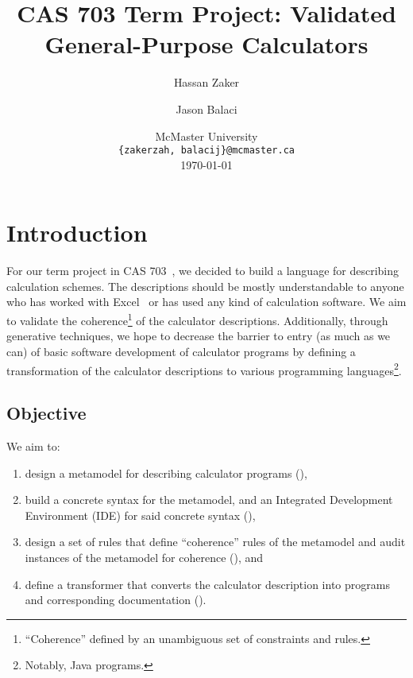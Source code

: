\documentclass[11pt,fleqn]{article}
\title{\vspace{-3.5cm}CAS 703 Term Project: Validated General-Purpose Calculators}
\author{Hassan Zaker \and Jason Balaci}
\date{
	McMaster University \\ \texttt{\{zakerzah, balacij\}@mcmaster.ca}\\%
	\today
}
\begin{document}
\maketitle

\tableofcontents

\lstlistoflistings

\newpage{}

\section{Introduction}
\label{sec:introduction}

For our term project in CAS 703~\cite{Paige7032023}, we decided to build a
language for describing calculation schemes. The descriptions should be mostly
understandable to anyone who has worked with Excel~\cite{Excel} or has used any
kind of calculation software. We aim to validate the
coherence\footnote{``Coherence'' defined by an unambiguous set of constraints
and rules.} of the calculator descriptions. Additionally, through generative
techniques, we hope to decrease the barrier to entry (as much as we can) of
basic software development of calculator programs by defining a transformation
of the calculator descriptions to various programming
languages\footnote{Notably, Java programs.}.

\subsection{Objective}

We aim to:

\begin{enumerate}

  \item design a metamodel for describing calculator programs
        (),

  \item build a concrete syntax for the metamodel, and an Integrated Development
        Environment (IDE) for said concrete syntax
        (),

  \item design a set of rules that define ``coherence'' rules of the metamodel
        and audit instances of the metamodel for coherence
        (), and

  \item define a transformer that converts the calculator description into
        programs and corresponding documentation
        ().

\end{enumerate}
\end{document}
